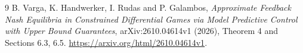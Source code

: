 \documentclass[11pt]{article}
\theoremstyle{remark}
\begin{document}
\begin{thebibliography}{9}
 B. Varga, K. Handwerker, I. Rudas and P. Galambos, \emph{Approximate Feedback Nash Equilibria in Constrained Differential Games via Model Predictive Control with Upper Bound Guarantees}, arXiv:2610.04614v1 (2026), Theorem 4 and Sections 6.3, 6.5. \url{https://arxiv.org/html/2610.04614v1}.
\end{thebibliography}
\end{document}

